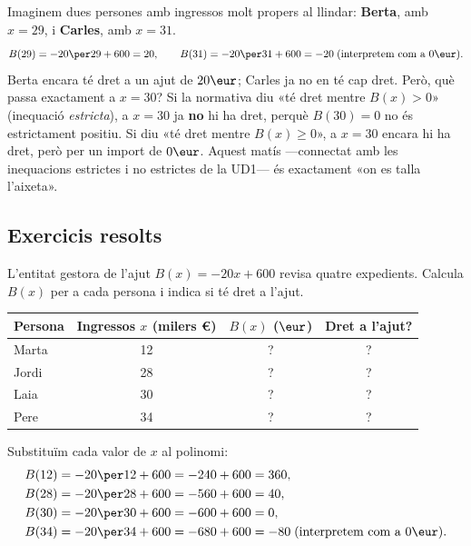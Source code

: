 \begin{exemple}
Imaginem dues persones amb ingressos molt propers al llindar: \textbf{Berta},
amb $x=29$, i \textbf{Carles}, amb $x=31$.
\[
B(29)=-20\per29+600=20, \qquad
B(31)=-20\per31+600=-20\;\text{(interpretem com a $0\eur$)}.
\]
Berta encara té dret a un ajut de $20\eur$; Carles ja no en té cap dret. Però,
què passa exactament a $x=30$? Si la normativa diu «té dret mentre
$B(x)>0$» (inequació \emph{estricta}), a $x=30$ ja \textbf{no} hi ha dret,
perquè $B(30)=0$ no és estrictament positiu. Si diu «té dret mentre
$B(x)\geq0$», a $x=30$ encara hi ha dret, però per un import de $0\eur$.
Aquest matís —connectat amb les inequacions estrictes i no estrictes de la
UD1— és exactament «on es talla l'aixeta».
\end{exemple}

\subsection{Exercicis resolts}

\begin{exresolt}
L'entitat gestora de l'ajut $B(x)=-20x+600$ revisa quatre expedients.
Calcula $B(x)$ per a cada persona i indica si té dret a l'ajut.
\begin{center}
\begin{tabular}{lccc}
\toprule
Persona & Ingressos $x$ (milers €) & $B(x)$ ($\eur$) & Dret a l'ajut? \\
\midrule
Marta & 12 & ? & ? \\
Jordi & 28 & ? & ? \\
Laia  & 30 & ? & ? \\
Pere  & 34 & ? & ? \\
\bottomrule
\end{tabular}
\end{center}
\solucio
Substituïm cada valor de $x$ al polinomi:
\begin{align*}
B(12)&=-20\per12+600=-240+600=360,\\
B(28)&=-20\per28+600=-560+600=40,\\
B(30)&=-20\per30+600=-600+600=0,\\
B(34)&=-20\per34+600=-680+600=-80 \;\text{(interpretem com a $0\eur$)}.
\end{align*}
\end{exresolt}

